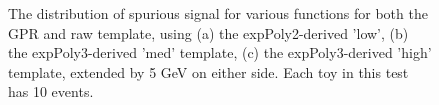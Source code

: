 \begin{figure} 
\begin{center}

\caption{The distribution of spurious signal for various functions for both the GPR and raw template, using (a) the expPoly2-derived 'low', (b) the expPoly3-derived 'med' template, (c) the expPoly3-derived 'high' template, extended by 5 GeV on either side. Each toy in this test has 10 events.}
\label{fig:padded_lowpt_10_noSig}
\end{center}
\end{figure}

